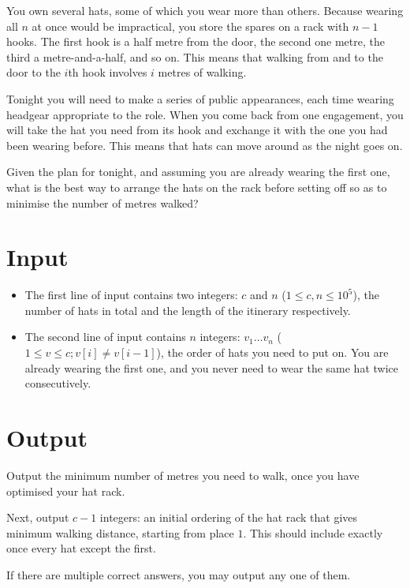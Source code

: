
You own several hats, some of which you wear more than others. Because wearing
all $n$ at once would be impractical, you store the spares on a rack with $n-1$
hooks. The first hook is a half metre from the door, the second one metre, the
third a metre-and-a-half, and so on. This means that walking from and to the
door to the $i$th hook involves $i$ metres of walking.

Tonight you will need to make a series of public appearances, each time wearing
headgear appropriate to the role. When you come back from one engagement, you
will take the hat you need from its hook and exchange it with the one you had
been wearing before. This means that hats can move around as the night goes on.

Given the plan for tonight, and assuming you are already wearing the first one,
what is the best way to arrange the hats on the rack before setting off so as
to minimise the number of metres walked?

\section*{Input}

\begin{itemize}
  \item The first line of input contains two integers: $c$ and $n$
        ($1 \le c, n \le 10^5$), the number of hats in total and
        the length of the itinerary respectively.
  \item The second line of input contains $n$ integers: $v_1 \ldots v_n$
        ($1 \le v \le c; v[i] \ne v[i-1]$), the order of hats you need to put
        on. You are already wearing the first one, and you never need to wear
        the same hat twice consecutively.
\end{itemize}

\section*{Output}

Output the minimum number of metres you need to walk, once you have optimised
your hat rack.

Next, output $c-1$ integers: an initial ordering of the hat rack that gives
minimum walking distance, starting from place $1$. This should include exactly
once every hat except the first.

If there are multiple correct answers, you may output any one of them.
